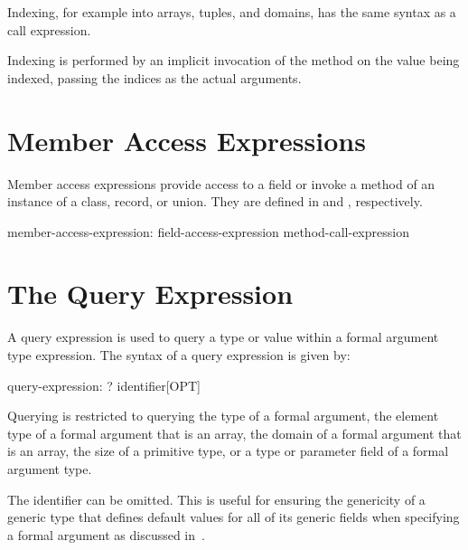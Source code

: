 Indexing, for example into arrays, tuples, and domains,
has the same syntax as a call expression.
 
Indexing is performed by an implicit invocation of the  method
on the value being indexed,
passing the indices as the actual arguments.

\section{Member Access Expressions}
\label{Member_Access_Expressions}

Member access expressions provide access to a field or invoke a method
of an instance of a class, record, or union.
They are defined in  and
, respectively.

\begin{syntax}
member-access-expression:
  field-access-expression
  method-call-expression
\end{syntax}

\section{The Query Expression}
\label{The_Query_Expression}

A query expression is used to query a type or value within a formal
argument type expression.  The syntax of a query expression is given
by:
\begin{syntax}
query-expression:
  ? identifier[OPT]
\end{syntax}
Querying is restricted to querying the type of a formal argument, the
element type of a formal argument that is an array, the domain of a
formal argument that is an array, the size of a primitive type, or a
type or parameter field of a formal argument type.

The identifier can be omitted.  This is useful for ensuring the
genericity of a generic type that defines default values for all of
its generic fields when specifying a formal argument as discussed
in~.

